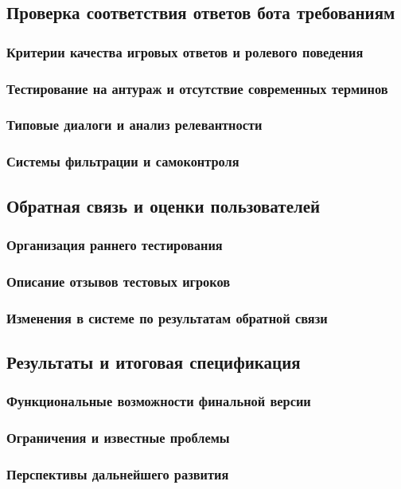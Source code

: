 \subsection{Проверка соответствия ответов бота требованиям}
\subsubsection{Критерии качества игровых ответов и ролевого поведения}
\subsubsection{Тестирование на антураж и отсутствие современных терминов}
\subsubsection{Типовые диалоги и анализ релевантности}
\subsubsection{Системы фильтрации и самоконтроля}

\subsection{Обратная связь и оценки пользователей}
\subsubsection{Организация раннего тестирования}
\subsubsection{Описание отзывов тестовых игроков}
\subsubsection{Изменения в системе по результатам обратной связи}

\subsection{Результаты и итоговая спецификация}
\subsubsection{Функциональные возможности финальной версии}
\subsubsection{Ограничения и известные проблемы}
\subsubsection{Перспективы дальнейшего развития}
